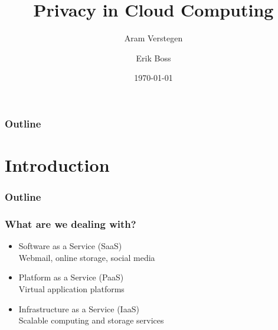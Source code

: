 \documentclass{beamer}
\title{Privacy in Cloud Computing}
\author{Aram Verstegen \and Erik Boss}
\institute{Radboud University Nijmegen}
\date{\today}
\begin{document}
\begin{frame}
  \titlepage
\end{frame}

\begin{frame}
  \frametitle{Outline}
  \tableofcontents
\end{frame}


\section{Introduction}

\begin{frame}
  \frametitle{Outline}
\end{frame}

\begin{frame}
    \frametitle{What are we dealing with?}
    \begin{itemize}
        \item Software as a Service (SaaS) \\
            \scriptsize{Webmail, online storage, social media}
        \item Platform as a Service (PaaS) \\
            \scriptsize{Virtual application platforms}
        \item Infrastructure as a Service (IaaS) \\
            \scriptsize{Scalable computing and storage services}
    \end{itemize}
\end{frame}
\end{document}
